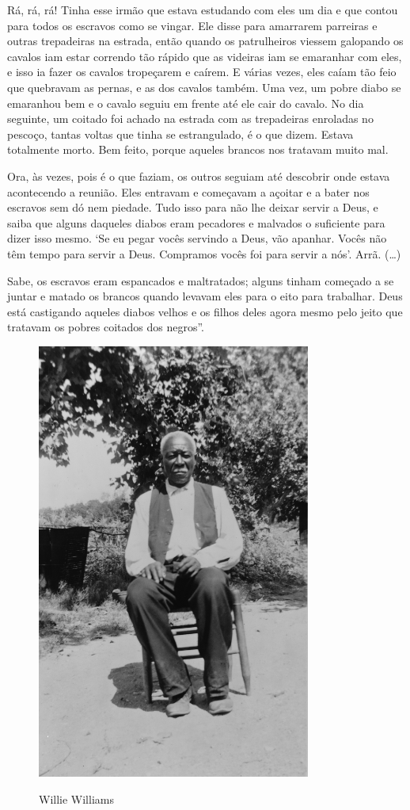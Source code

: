 Rá, rá, rá! Tinha esse irmão que estava estudando com eles um dia e que
contou para todos os escravos como se vingar. Ele disse para amarrarem
parreiras e outras trepadeiras na estrada, então quando os patrulheiros
viessem galopando os cavalos iam estar correndo tão rápido que as
videiras iam se emaranhar com eles, e isso ia fazer os cavalos
tropeçarem e caírem. E várias vezes, eles caíam tão feio que quebravam
as pernas, e as dos cavalos também. Uma vez, um pobre diabo se emaranhou
bem e o cavalo seguiu em frente até ele cair do cavalo. No dia seguinte,
um coitado foi achado na estrada com as trepadeiras enroladas no
pescoço, tantas voltas que tinha se estrangulado, é o que dizem. Estava
totalmente morto. Bem feito, porque aqueles brancos nos tratavam muito
mal.

Ora, às vezes, pois é o que faziam, os outros seguiam até descobrir onde
estava acontecendo a reunião. Eles entravam e começavam a açoitar e a
bater nos escravos sem dó nem piedade. Tudo isso para não lhe deixar %
servir a Deus, e saiba que alguns daqueles diabos eram pecadores e
malvados o suficiente para dizer isso mesmo. `Se eu pegar vocês servindo
a Deus, vão apanhar. Vocês não têm tempo para servir a Deus. Compramos
vocês foi para servir a nós'. Arrã. (\ldots{})

Sabe, os escravos eram espancados e maltratados; alguns tinham começado
a se juntar e matado os brancos quando levavam eles para o eito para
trabalhar. Deus está castigando aqueles diabos velhos e os filhos deles
agora mesmo pelo jeito que tratavam os pobres coitados dos negros''.

\pagebreak
\thispagestyle{empty}
\begin{figure}[!ht]
\centering
 \includegraphics[width=90mm]{./imgs/williewilliams_recorte.jpg} \label{img20}
\caption{Willie Williams}
\end{figure}

